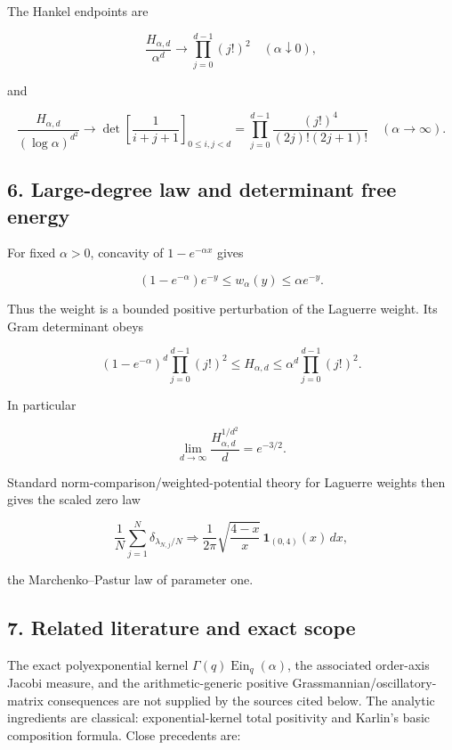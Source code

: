\documentclass[11pt]{article}
\theoremstyle{keio}
\theoremstyle{definition}
\theoremstyle{remark}
\newcommand{\Ein}{\operatorname{Ein}}
\begin{document}
The Hankel endpoints are

\[
\frac{H_{\alpha,d}}{\alpha^d}\to\prod_{j=0}^{d-1}(j!)^2
\quad(\alpha\downarrow0),
\]

and

\[
\frac{H_{\alpha,d}}{(\log\alpha)^{d^2}}
\to\det\left[\frac1{i+j+1}\right]_{0\le i,j<d}
=\prod_{j=0}^{d-1}\frac{(j!)^4}{(2j)!(2j+1)!}
\quad(\alpha\to\infty).
\]

\subsection{6. Large-degree law and determinant free energy}

For fixed \(\alpha>0\), concavity of \(1-e^{-\alpha x}\) gives

\[
(1-e^{-\alpha})e^{-y}\le w_\alpha(y)\le\alpha e^{-y}. \tag{TP-8}
\]

Thus the weight is a bounded positive perturbation of the Laguerre weight.
Its Gram determinant obeys

\[
(1-e^{-\alpha})^d\prod_{j=0}^{d-1}(j!)^2
\le H_{\alpha,d}\le
\alpha^d\prod_{j=0}^{d-1}(j!)^2. \tag{TP-9}
\]

In particular

\[
\lim_{d\to\infty}\frac{H_{\alpha,d}^{1/d^2}}d=e^{-3/2}. \tag{TP-10}
\]

Standard norm-comparison/weighted-potential theory for Laguerre weights
then gives the scaled zero law

\[
\frac1N\sum_{j=1}^N\delta_{\lambda_{N,j}/N}
\Longrightarrow
\frac1{2\pi}\sqrt{\frac{4-x}{x}}\,\mathbf1_{(0,4)}(x)\,dx,
\]

the Marchenko--Pastur law of parameter one.

\subsection{7. Related literature and exact scope}

The exact polyexponential kernel \(\Gamma(q)\Ein_q(\alpha)\), the associated
order-axis Jacobi measure, and the arithmetic-generic positive
Grassmannian/oscillatory-matrix consequences are not supplied by the sources
cited below.  The analytic ingredients are
classical: exponential-kernel total positivity and Karlin's basic composition
formula. Close precedents are:
\end{document}

